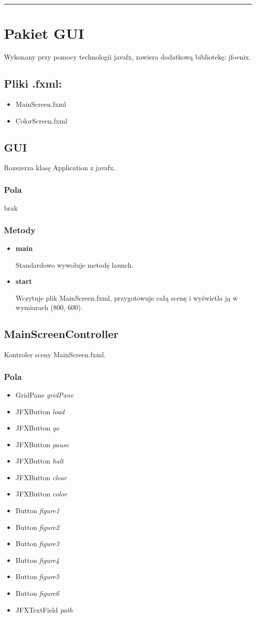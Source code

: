 \documentclass[a4paper,11pt]{article}
\newcommand{\linia}{\rule{\linewidth}{0.4mm}}
\begin{document}
\noindent\linia
\section{Pakiet GUI}

Wykonany przy pomocy technologii javafx, zawiera dodatkową bibliotekę: jfoenix.

\subsection{Pliki .fxml:}
\begin{itemize}
\item MainScreen.fxml
\item ColorScreen.fxml
\end{itemize}

\subsection{GUI}
Rozszerza klasę Application z javafx.
\subsubsection{Pola}
brak
\subsubsection{Metody}
\begin{itemize}
\item \textbf{main}

Standardowo wywołuje metodę launch.
\item \textbf{start}

Wczytuje plik MainScreen.fxml, przygotowuje całą scenę i wyświetla ją w wymiarach (800, 600).
\end{itemize}


\subsection{MainScreenController}
Kontroler sceny MainScreen.fxml.
\subsubsection{Pola}
\begin{itemize}
\item GridPane \textit{gridPane}
\item JFXButton \textit{load}
\item JFXButton \textit{go}
\item JFXButton \textit{pause}
\item JFXButton \textit{halt}
\item JFXButton \textit{clear}
\item JFXButton \textit{color}
\item Button \textit{figure1}
\item Button \textit{figure2}
\item Button \textit{figure3}
\item Button \textit{figure4}
\item Button \textit{figure5}
\item Button \textit{figure6}
\item JFXTextField \textit{path}
\end{itemize}
\end{document}
